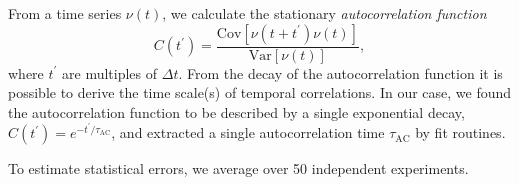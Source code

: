 From a time series $\nu(t)$, we calculate the stationary \textit{autocorrelation function}
\begin{equation}\label{eq:correlation}
	C(t^\prime) = \frac{\text{Cov}[\nu(t+t^\prime)\nu(t)]}{\text{Var}[\nu(t)]},
\end{equation}
where $t^\prime$ are multiples of $\Delta t$.
From the decay of the autocorrelation function it is possible to derive the time scale(s) of temporal correlations.
In our case, we found the autocorrelation function to be described by a single exponential decay, $C(t^\prime)=e^{-t^\prime/\tau_\mathrm{AC}}$, and extracted a single autocorrelation time $\tau_\mathrm{AC}$ by fit routines.

To estimate statistical errors, we average over \num{50} independent experiments.

